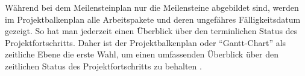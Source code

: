 Während bei dem Meilensteinplan nur die Meilensteine abgebildet sind, werden im Projektbalkenplan alle Arbeitspakete und deren ungefähres Fälligkeitsdatum gezeigt. So hat man jederzeit einen Überblick über den terminlichen Status des Projektfortschritts. Daher ist der Projektbalkenplan oder \enquote{Gantt-Chart}  als zeitliche Ebene die erste Wahl, um einen umfassenden Überblick über den zeitlichen Status des Projektfortschritts zu behalten \cite{domendos:2019}.